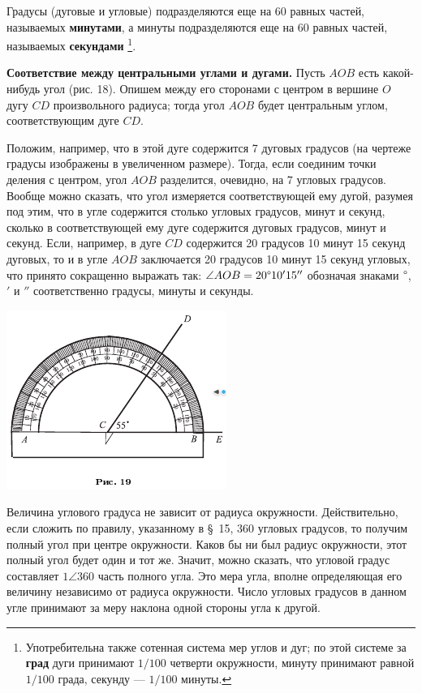 \documentclass[oneside]{book}
\begin{document}
Градусы (дуговые и угловые) подразделяются еще на 60 равных частей, называемых \textbf{минутами}, а минуты подразделяются еще на 60 равных частей, называемых \textbf{секундами}%
\footnote{Употребительна также сотенная система мер углов и дуг;
по этой системе за \textbf{град} дуги принимают $1/100$ четверти окружности, минуту принимают равной $1/100$ града, секунду — $1/100$ минуты.}.


\textbf{Соответствие между центральными углами и дугами.}
Пусть $AOB$ есть какой-нибудь угол (рис. 18).
Опишем между его сторонами с центром в вершине $O$ дугу $CD$ произвольного радиуса;
тогда угол $AOB$ будет центральным углом, соответствующим дуге $CD$.

Положим, например, что в этой дуге содержится 7 дуговых градусов (на чертеже градусы изображены в увеличенном размере).
Тогда, если соединим точки деления с центром, угол $AOB$ разделится, очевидно, на 7 угловых градусов.
Вообще можно сказать, что угол измеряется соответствующей ему дугой, разумея под этим, что в угле содержится столько угловых градусов, минут и секунд, сколько в соответствующей ему дуге содержится дуговых градусов, минут и секунд.
Если, например, в дуге $CD$ содержится 20 градусов 10 минут 15 секунд дуговых, то и в угле $AOB$ заключается 20 градусов 10 минут 15 секунд угловых, что принято сокращенно выражать так:
$\angle AOB = 20\degree 10'15''$ обозначая знаками $\degree $, $'$ и $''$ соответственно градусы, минуты и секунды.

\includegraphics{pics/ris-19}

Величина углового градуса не зависит от радиуса окружности.
Действительно, если сложить по правилу, указанному в §~15, 360 угловых градусов, то получим полный угол при центре окружности.
Каков бы ни был радиус окружности, этот полный угол будет один и тот же.
Значит, можно сказать, что угловой градус составляет $1\angle 360$ часть полного угла.
Это мера угла, вполне определяющая его величину независимо от радиуса окружности.
Число угловых градусов в данном угле принимают за меру наклона одной стороны угла к другой.
\end{document}

